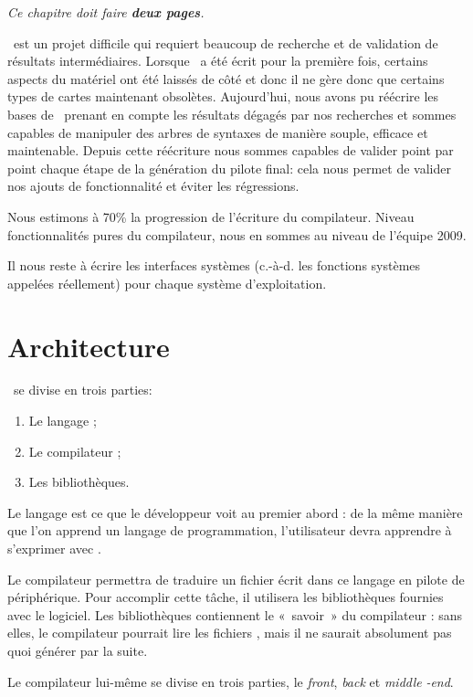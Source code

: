 \documentclass[francais]{rtxreport}
\begin{document}
\emph{Ce chapitre doit faire \textbf{deux pages}.}

\rtx\ est un projet difficile qui requiert beaucoup de recherche et de
validation de résultats intermédiaires. Lorsque \rtx\ a été écrit pour la
première fois, certains aspects du matériel ont été laissés de côté et donc il
ne gère donc que certains types de cartes maintenant obsolètes. Aujourd'hui,
nous avons pu réécrire les bases de \rtx\ prenant en compte les résultats
dégagés par nos recherches et sommes capables de manipuler des arbres de
syntaxes de manière souple, efficace et maintenable. Depuis cette réécriture
nous sommes capables de valider point par point chaque étape de la génération du
pilote final: cela nous permet de valider nos ajouts de fonctionnalité et éviter
les régressions.

Nous estimons à 70\% la progression de l’écriture du compilateur. Niveau
fonctionnalités pures du compilateur, nous en sommes au niveau de l'équipe 2009.

Il nous reste à écrire les interfaces systèmes (c.-à-d. les fonctions systèmes
appelées réellement) pour chaque système d’exploitation.

\section{Architecture}
\rtx\ se divise en trois parties:
\begin{enumerate}
	\item Le langage ;
	\item Le compilateur ;
	\item Les bibliothèques.
\end{enumerate}

Le langage est ce que le développeur voit au premier abord : de la même manière
que l’on apprend un langage de programmation, l’utilisateur devra apprendre à
s’exprimer avec \rtx.

Le compilateur permettra de traduire un fichier écrit dans ce langage en pilote
de périphérique. Pour accomplir cette tâche, il utilisera les bibliothèques
fournies avec le logiciel. Les bibliothèques contiennent le «~savoir~» du
compilateur : sans elles, le compilateur pourrait lire les fichiers \rtx, mais
il ne saurait absolument pas quoi générer par la suite.

Le compilateur lui-même se divise en trois parties, le \emph{front}, \emph{back}
et \emph{middle} \emph{-end}.
\end{document}
